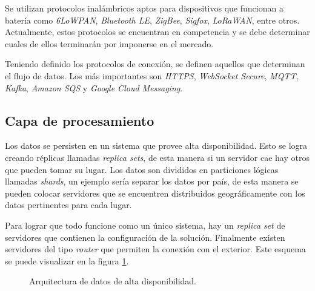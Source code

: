 		Se utilizan protocolos inalámbricos aptos para dispositivos que funcionan a batería como \emph{6LoWPAN}, \emph{Bluetooth LE}, \emph{ZigBee}, \emph{Sigfox}, \emph{LoRaWAN}, entre otros. Actualmente, estos protocolos se encuentran en competencia y se debe determinar cuales de ellos terminarán por imponerse en el mercado.
		
		Teniendo definido los protocolos de conexión, se definen aquellos que determinan el flujo de datos. Los más importantes son \emph{HTTPS}, \emph{WebSocket Secure}, \emph{MQTT}, \emph{Kafka}, \emph{Amazon SQS} y \emph{Google Cloud Messaging}.
	
	\subsection{Capa de procesamiento}
	\label{artProcesamiento}
	
		Los datos se persisten en un sistema que provee alta disponibilidad. Esto se logra creando réplicas llamadas \emph{replica sets}, de esta manera si un servidor cae hay otros que pueden tomar su lugar. Los datos son divididos en particiones lógicas llamadas \emph{shards}, un ejemplo sería separar los datos por país, de esta manera se pueden colocar servidores que se encuentren distribuidos geográficamente con los datos pertinentes para cada lugar.
		
		Para lograr que todo funcione como un único sistema, hay un \emph{replica set} de servidores que contienen la configuración de la solución. Finalmente existen servidores del tipo \emph{router} que permiten la conexión con el exterior. Este esquema se puede visualizar en la figura \ref{fig:mongodb}.
	
		\begin{figure}[h]
			\centering
			\caption{Arquitectura de datos de alta disponibilidad.}
			\label{fig:mongodb}
		\end{figure}
	

